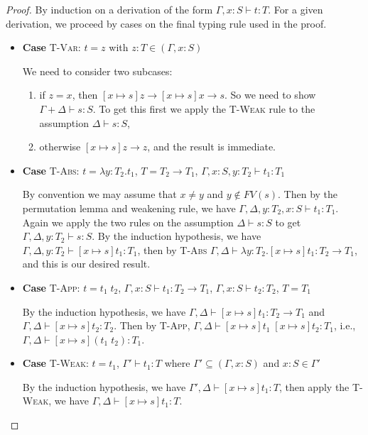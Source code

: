 \documentclass[conference]{IEEEtran}
\newcommand\lam[2]{\lambda #1.#2}
\begin{document}
\begin{proof}
	By induction on a derivation of the form $\Gamma,x:S\vdash t:T$. For a given derivation, we proceed by cases on the final typing rule used in the proof.
	\begin{itemize}		
		\item\textbf{Case} \textsc{T-Var}: $t=z$ with $z:T\in(\Gamma,x:S)$
		
		We need to consider two subcases: 
		\begin{enumerate}
			\item if $z=x$, then $[x\mapsto s]z\to[x\mapsto s]x\to s$. So we need to show $\Gamma+\Delta\vdash s:S$. To get this first we apply the \textsc{T-Weak} rule to the assumption $\Delta\vdash s:S$,
			\item otherwise $[x\mapsto s]z\to z$, and the result is immediate.
		\end{enumerate}	
		
		\item\textbf{Case} \textsc{T-Abs}: $t=\lam{y:T_2}{t_1}$, $T=T_2\to T_1$, $\Gamma,x:S,y:T_2\vdash t_1:T_1$
		
		By convention we may assume that $x\ne y$ and $y\notin FV(s)$. Then by the permutation lemma and weakening rule, we have $\Gamma,\Delta,y:T_2,x:S\vdash t_1:T_1$. Again we apply the two rules on the assumption $\Delta\vdash s:S$ to get $\Gamma,\Delta,y:T_2\vdash s:S$. By the induction hypothesis, we have $\Gamma,\Delta,y:T_2\vdash [x\mapsto s]t_1:T_1$, then by \textsc{T-Abs} $\Gamma,\Delta\vdash \lam{y:T_2}{[x\mapsto s]t_1}:T_2\to T_1$, and this is our desired result.
		
		\item\textbf{Case} \textsc{T-App}: $t=t_1\; t_2$, $\Gamma,x:S\vdash t_1:T_2\to T_1$, $\Gamma,x:S\vdash t_2:T_2$, $T=T_1$
		
		By the induction hypothesis, we have $\Gamma,\Delta\vdash [x\mapsto s]t_1:T_2\to T_1$ and $\Gamma,\Delta\vdash [x\mapsto s]t_2:T_2$. Then by \textsc{T-App}, $\Gamma,\Delta\vdash [x\mapsto s]t_1\; [x\mapsto s]t_2:T_1$, i.e., $\Gamma,\Delta\vdash [x\mapsto s](t_1\; t_2):T_1$.
		
		\item\textbf{Case} \textsc{T-Weak}: $t=t_1$, $\Gamma'\vdash t_1:T$ where $\Gamma'\subseteq(\Gamma,x:S)$ and $x:S\in\Gamma'$
		
		By the induction hypothesis, we have $\Gamma',\Delta\vdash [x\mapsto s]t_1:T$, then apply the \textsc{T-Weak}, we have $\Gamma,\Delta\vdash [x\mapsto s]t_1:T$.
		

\end{itemize}
\end{proof}
\end{document}
